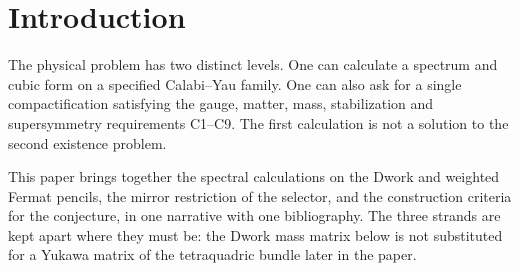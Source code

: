 
\begin{abstract}
We test the Geometric Selection Conjecture against explicit heterotic
data. For the Dwork and weighted Fermat pencils we compute the generations,
their cubic couplings and mass maps, and exclude three-family
standard-embedding quotients of thirteen hypergeometric families. On a
threefold with at most four K\"ahler parameters every polystable sum of
five line bundles with $c_1=0$ keeps a massless Abelian gauge boson. On a
smooth tetraquadric with a free $(\Z/2)^2$ action, extensions of such sums
remove it, and one of them descends to the quotient with three families,
one Higgs pair, no charged exotics and no extra gauge boson. No bundle
on this quotient whose pullback is built by extensions from the eleven
three-family line-bundle data has three Yukawa matrices of full rank at
large volume. The
conjecture remains unproved.
\end{abstract}
\maketitle

\section{Introduction}\label{sec:intro}
The physical problem has two distinct levels. One can calculate a
spectrum and cubic form on a specified Calabi--Yau family. One can also
ask for a single compactification satisfying the gauge, matter, mass,
stabilization and supersymmetry requirements C1--C9. The first calculation
is not a solution to the second existence problem.

This paper brings together the spectral calculations on the Dwork and
weighted Fermat pencils, the mirror restriction of the selector, and the
construction criteria for the conjecture, in one narrative with one
bibliography. The three strands are kept apart where they must be: the
Dwork mass matrix below is not substituted for a Yukawa matrix of the
tetraquadric bundle later in the paper.

